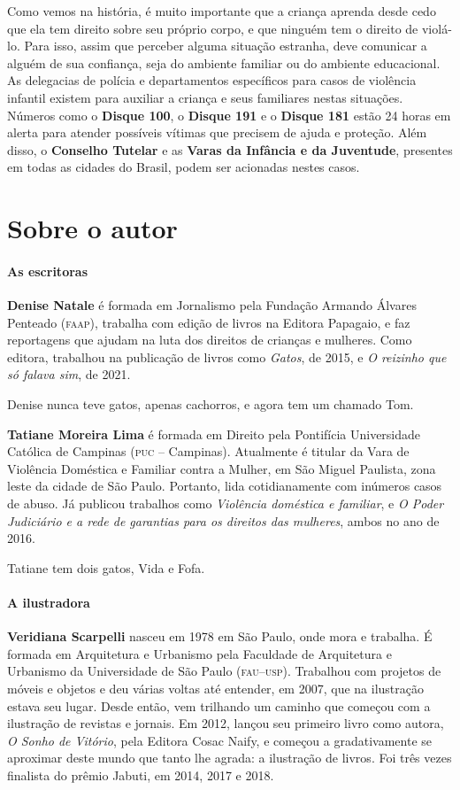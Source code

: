 \documentclass[11pt]{extarticle}
\begin{document}
Como vemos na história, é muito importante que a criança aprenda desde 
cedo que ela tem direito sobre seu próprio corpo, e que ninguém tem o 
direito de violá-lo. Para isso, assim que perceber alguma situação estranha, deve comunicar a alguém de sua confiança, seja do ambiente
familiar ou do ambiente educacional. As delegacias de polícia e departamentos
específicos para casos de violência infantil existem para auxiliar a criança e 
seus familiares nestas situações. Números como o \textbf{Disque 100}, 
o \textbf{Disque 191} e o \textbf{Disque 181} estão 24 horas em alerta
para atender possíveis vítimas que precisem de ajuda e proteção. 
Além disso, o \textbf{Conselho Tutelar} e as \textbf{Varas da Infância e da Juventude},
presentes em todas as cidades do Brasil, podem ser acionadas nestes casos. 

\section{Sobre o autor}

\paragraph{As escritoras} \textbf{Denise Natale} é formada em Jornalismo pela Fundação
Armando Álvares Penteado (\textsc{faap}), trabalha com edição de livros na 
Editora Papagaio, e faz reportagens que ajudam na luta dos direitos de crianças e mulheres. 
Como editora, trabalhou na publicação de livros como \textit{Gatos}, de 2015, e
\textit{O reizinho que só falava sim}, de 2021.

Denise nunca teve gatos, apenas cachorros, e agora tem um chamado Tom. 

\textbf{Tatiane Moreira Lima} é formada em Direito pela Pontifícia Universidade Católica de Campinas 
(\textsc{puc} -- Campinas). Atualmente é titular da Vara de Violência Doméstica e Familiar contra a Mulher, 
em São Miguel Paulista, zona leste da cidade de São Paulo. Portanto, lida cotidianamente com
inúmeros casos de abuso. Já publicou trabalhos como \textit{Violência doméstica e familiar},
e \textit{O Poder Judiciário e a rede de garantias para os direitos das mulheres}, ambos no ano de 2016.

Tatiane tem dois gatos, Vida e Fofa. 

\paragraph{A ilustradora} \textbf{Veridiana Scarpelli} nasceu em 1978 em São Paulo, onde mora e trabalha.
É formada em Arquitetura e Urbanismo pela Faculdade de Arquitetura e Urbanismo da Universidade de São
Paulo (\textsc{fau--usp}). Trabalhou com projetos de móveis e objetos e deu várias voltas até entender, em 2007,
que na ilustração estava seu lugar. Desde então, vem trilhando um caminho que começou com a ilustração de revistas e jornais. Em 2012, lançou seu primeiro livro como autora, \textit{O Sonho de Vitório}, pela Editora Cosac Naify, 
e começou a gradativamente se aproximar deste mundo que tanto lhe agrada: a ilustração de livros. 
Foi três vezes finalista do prêmio Jabuti, em 2014, 2017 e 2018.
\end{document}
